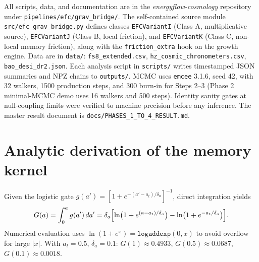 \documentclass[11pt,a4paper]{article}
\begin{document}
\begin{sloppypar}
All scripts, data, and documentation are in the \emph{energyflow-cosmology} repository under \texttt{pipelines/efc/grav\_bridge/}. The self-contained source module \texttt{src/efc\_grav\_bridge.py} defines classes \texttt{EFCVariantI} (Class A, multiplicative source), \texttt{EFCVariantJ} (Class B, local friction), and \texttt{EFCVariantK} (Class C, non-local memory friction), along with the \texttt{friction\_extra} hook on the growth engine. Data are in \texttt{data/}: \texttt{fs8\_extended.csv}, \texttt{hz\_cosmic\_chronometers.csv}, \texttt{bao\_desi\_dr2.json}. Each analysis script in \texttt{scripts/} writes timestamped JSON summaries and NPZ chains to \texttt{outputs/}. MCMC uses \texttt{emcee} 3.1.6, seed 42, with 32 walkers, 1500 production steps, and 300 burn-in for Steps 2--3 (Phase 2 minimal-MCMC demo uses 16 walkers and 500 steps). Identity sanity gates at null-coupling limits were verified to machine precision before any inference. The master result document is \texttt{docs/PHASES\_1\_TO\_4\_RESULT.md}.
\end{sloppypar}

\section{Analytic derivation of the memory kernel}

Given the logistic gate $g(a') = [1 + e^{-(a'-a_t)/\delta_a}]^{-1}$, direct integration yields
\begin{equation}
    G(a) = \int_0^a g(a')\,da' = \delta_a\Bigl[\ln\bigl(1 + e^{(a-a_t)/\delta_a}\bigr) - \ln\bigl(1 + e^{-a_t/\delta_a}\bigr)\Bigr].
\end{equation}
Numerical evaluation uses $\ln(1+e^x) = \texttt{logaddexp}(0, x)$ to avoid overflow for large $|x|$. With $a_t = 0.5$, $\delta_a = 0.1$:  $G(1) \approx 0.4933$, $G(0.5) \approx 0.0687$, $G(0.1) \approx 0.0018$.
\end{document}
